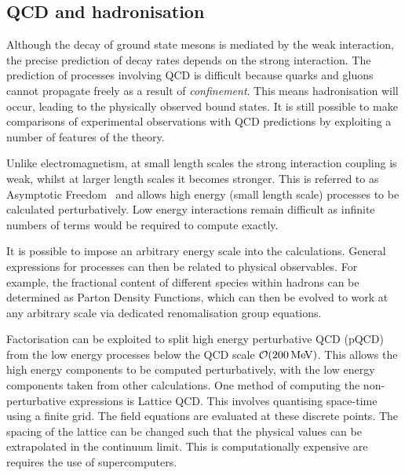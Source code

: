 \subsection{QCD and hadronisation}
\label{sec:theory_QCD}
Although the decay of ground state \Bp mesons is mediated by the weak interaction, the precise prediction of decay rates depends on the strong interaction.  
The prediction of processes involving QCD is difficult because quarks and gluons cannot propagate freely as a result of \emph{confinement}. This means hadronisation will occur, leading to the physically observed bound states. It is still possible to make comparisons of experimental observations with QCD predictions by exploiting a number of features of the theory. 

Unlike electromagnetism, at small length scales the strong interaction coupling is weak, whilst at larger length scales it becomes stronger. This is referred to as Asymptotic Freedom~\cite{PhysRevLett.30.1343,PhysRevLett.30.1346} and allows high energy (small length scale) processes to be calculated perturbatively. Low energy interactions remain difficult as infinite numbers of terms would be required to compute exactly.  

It is possible to impose an arbitrary energy scale into the calculations. General expressions for processes can then be related to physical observables. 
For example, the fractional content of different species within hadrons can be determined as Parton Density Functions, which can then be evolved to work at any arbitrary scale via dedicated renomalisation group equations. 

Factorisation can be exploited to split high energy perturbative QCD (pQCD) from the low energy processes below the QCD scale $\mathcal{O}(200\mathrm{\,Me\kern -0.1em V})$. This allows the high energy components to be computed perturbatively, with the low energy components taken from other calculations. One method of computing the non-perturbative expressions is Lattice QCD. This involves quantising space-time using a finite grid. The field equations are evaluated at these discrete points. The spacing of the lattice can be changed such that the physical values can be extrapolated in the continuum limit. This is computationally expensive are requires the use of supercomputers. 


